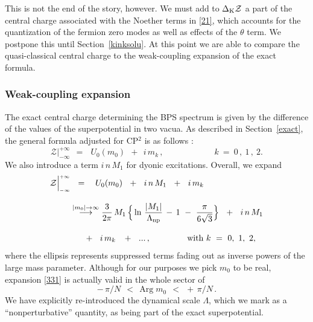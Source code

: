 \documentclass[epsfig,12pt]{article}
\def\beq{\begin{equation}}
\def\eeq{\end{equation}}
\def\beq{\begin{equation}}
\def\eeq{\end{equation}}
\newcommand{\mc}[1]{\mathcal{#1}}
\begin{document}
	This is not the end of the story, however. We must add to $\Delta_{\rm K}{\mathcal Z}$
	a part of the central charge associated with the Noether terms in \eqref{21}, which accounts for the quantization of the
	fermion zero modes as well as effects of the $\theta$ term.
	We postpone this until Section~\ref{kinksolu}.
	At this point we are able to compare the quasi-classical central charge 
	to the weak-coupling expansion of the exact formula.




\subsubsection{Weak-coupling expansion}
\label{weakexp}

	The exact central charge determining the BPS spectrum is given by the difference of the values of the superpotential in  two vacua.
	As described in Section~\ref{exact}, the general formula adjusted for CP$^2$ is as follows \cite{Bolokhov:2011mp}:
\beq
       \mc{Z}\Big|^{\scriptscriptstyle +\infty}_{\scriptscriptstyle -\infty} 
	~~=~~~ 
       U_0(m_0) ~~+~~ i\, m_k\,, \qquad\qquad\qquad k ~=~ 0\,,~1\,,~2.
\eeq
	We also introduce a term $ i\, n\, M_1 $ for dyonic excitations.
	Overall, we expand
\begin{align}
%
\label{331}
       \mc{Z}\Big|^{\scriptscriptstyle +\infty}_{\scriptscriptstyle -\infty} 
       & 
	~~=~~~ 
       U_0(m_0)  ~~+~~ i\, n\, M_1 ~~+~~ i\, m_k
	\\[3mm]
%
\notag
       &
	\stackrel{|m_0|\to\infty}{\longrightarrow} 
       \frac{3}{2\pi}\, M_1\, \Big\{ \ln\, \frac {   |M_1|   }
                                                 {  \Lambda_\text{np}  } \,-\, 1 
						 ~-~ \frac{\pi}{6\sqrt{3}}
						\Big\}  ~~+~~  i\, n  \, M_1
	\\[3mm]
%
\notag
	&
	~~~
	~~+~~ i\,  m_k \,~~+~~ ...\,,
	\qquad\qquad\ \text{with}~ k ~=~ 0,~1,~ 2,
\end{align}
	where the ellipsis represents  suppressed terms fading out as inverse powers of the large mass parameter.
	Although for our purposes we pick $ m_0 $ to be real, expansion \eqref{331} is actually valid in 
	the whole sector of 
\beq
	 -\,\pi / N ~~<~~ \text{Arg}\;m_0 ~~<~~ +\,\pi / N \,.
\eeq
	We have explicitly re-introduced the dynamical scale $ \Lambda $, which we mark as a 
	``nonperturbative'' quantity, as being part of the exact superpotential.
\end{document}
